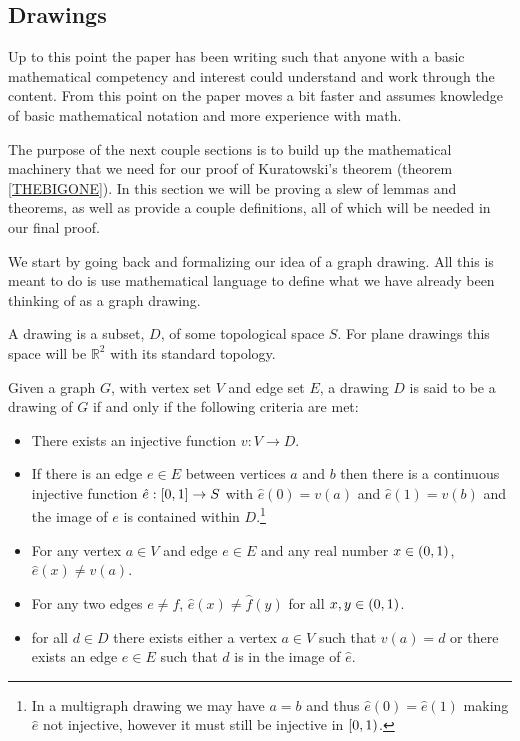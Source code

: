 \documentclass{article}
\begin{document}
\subsection{Drawings}
Up to this point the paper has been writing such that anyone with a basic mathematical competency and interest could understand and work through the content. From this point on the paper moves a bit faster and assumes knowledge of basic mathematical notation and more experience with math.

The purpose of the next couple sections is to build up the mathematical machinery that we need for our proof of Kuratowski's theorem (theorem \ref{THEBIGONE}). In this section we will be proving a slew of lemmas and theorems, as well as provide a couple definitions, all of which will be needed in our final proof.

We start by going back and formalizing our idea of a graph drawing. All this is meant to do is use mathematical language to define what we have already been thinking of as a graph drawing.

\begin{definition}[Drawing]
	A drawing is a subset, $D$, of some topological space $S$. For plane drawings this space will be $\mathbb R^2$ with its standard topology.
\end{definition}

\begin{definition}
Given a graph $G$, with vertex set $V$ and edge set $E$, a drawing $D$ is said to be a drawing of $G$ if and only if the following criteria are met:
\begin{itemize}
	\item There exists an injective function $v:V\to D$.
	\item If there is an edge $e\in E$ between vertices $a$ and $b$ then there is a continuous injective function $\hat e:\left[ {0} , {1} \right]\to S$ with $\hat e(0) = v(a)$ and $\hat e(1) = v(b)$ and the image of $e$ is contained within $D$.\footnote{In a multigraph drawing we may have $a=b$ and thus $\hat e(0) = \hat e(1)$ making $\hat e$ not injective, however it must still be injective in $\left[ {0} , {1} \right)$.}
	\item For any vertex $a\in V$ and edge $e\in E$ and any real number $x\in\left( {0} , {1} \right)$, $\hat e(x)\not=v(a)$.
	\item For any two edges $e\not=f$, $\hat e(x) \not= \hat f(y)$ for all $x,y \in\left( {0} , {1} \right)$.
	\item for all $d\in D$ there exists either a vertex $a\in V$ such that $v(a) = d$ or there exists an edge $e\in E$ such that $d$ is in the image of $\hat e$.
\end{itemize}
\end{definition}
\end{document}
